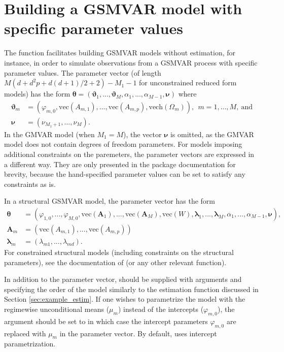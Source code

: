 \documentclass[nojss]{jss} %
\begin{document}
\section{Building a GSMVAR model with specific parameter values}\label{sec:GSMVAR}
The function  facilitates building GSMVAR models without estimation, for instance, in order to simulate observations from a GSMVAR process with specific parameter values. The parameter vector (of length $M(d + d^2p + d(d+1)/2 + 2) - M_1 - 1$ for unconstrained reduced form models) has the form $\boldsymbol{\theta} = (\boldsymbol{\vartheta}_1,...,\boldsymbol{\vartheta}_M,\alpha_1,...,\alpha_{M-1},\boldsymbol{\nu})$ where
\begin{align}
\boldsymbol{\vartheta}_m &= (\varphi_{m,0},\text{vec}({A_{m,1}}),...,\text{vec}(A_{m,p}),\text{vech}(\Omega_m)),\ \ m=1,...,M, \ \text{and}  \\
\boldsymbol{\nu} &= (\nu_{M_1+1},...,\nu_M).
\end{align}
%
In the GMVAR model (when $M_1=M$), the vector $\boldsymbol{\nu}$ is omitted, as the GMVAR model does not contain degrees of freedom parameters. For models imposing additional constraints on the paremeters, the parameter vectors are expressed in a different way. They are only presented in the package documentation for brevity, because the hand-specified parameter values can be set to satisfy any constraints as is.

In a structural GSMVAR model, the parameter vector has the form
\begin{align}
\boldsymbol{\theta} &= (\varphi_{1,0},...,\varphi_{M,0},\text{vec}(\boldsymbol{A}_1),...,\text{vec}(\boldsymbol{A}_M),\text{vec}(W),\boldsymbol{\lambda}_1,...,\boldsymbol{\lambda}_M, \alpha_1,...,\alpha_{M-1},\boldsymbol{\nu}), \\
\boldsymbol{A}_m & = (\text{vec}({A_{m,1}}),...,\text{vec}(A_{m,p})) \\
\boldsymbol{\lambda}_m &= (\lambda_{m1},...,\lambda_{md}).
\end{align}
For constrained structural models (including constraints on the structural parameters), see the documentation of  (or any other relevant function).

In addition to the parameter vector,  should be supplied with arguments  and  specifying the order of the model similarly to the estimation function  discussed in Section \ref{sec:example_estim}. If one wishes to parametrize the model with the regimewise unconditional means ($\mu_m$) instead of the intercepts ($\varphi_{m,0}$), the argument  should be set to  in which case the intercept parameters $\varphi_{m,0}$ are replaced with $\mu_m$ in the parameter vector. By default,  uses intercept parametrization.
\end{document}
